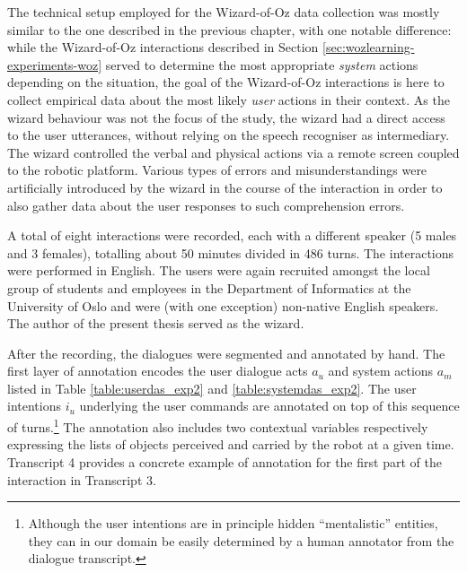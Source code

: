 The technical setup employed for the Wizard-of-Oz data collection was mostly similar to the one described in the previous chapter, with one notable difference:  while the Wizard-of-Oz interactions described in Section \ref{sec:wozlearning-experiments-woz} served to determine the most appropriate \textit{system} actions depending on the situation, the goal of the Wizard-of-Oz interactions is here to collect empirical data about the most likely \textit{user} actions in their context.  As the wizard behaviour was not the focus of the study, the wizard had a direct access to the user utterances, without relying on the speech recogniser as intermediary. The wizard controlled the verbal and physical actions via a remote screen coupled to the robotic platform. Various types of errors and misunderstandings were artificially introduced by the wizard in the course of the interaction in order to also gather data about the user responses to such comprehension errors. 

A total of eight interactions were recorded, each with a different speaker (5 males and 3 females), totalling about 50 minutes divided in 486 turns.  The interactions were performed in English. The users were again recruited amongst the local group of students and employees in the Department of Informatics at the University of Oslo and were (with one exception) non-native English speakers. The author of the present thesis served as the wizard. 

After the recording, the dialogues were segmented and annotated by hand. The first layer of annotation encodes the user dialogue acts $a_u$ and system actions $a_m$ listed in Table \ref{table:userdas_exp2} and \ref{table:systemdas_exp2}. The user intentions $i_u$ underlying the user commands are annotated on top of this sequence of turns.\footnote{Although the user intentions are in principle hidden ``mentalistic'' entities, they can in our domain be easily determined by a human annotator from the dialogue transcript.} The annotation also includes two contextual variables respectively expressing the lists of objects perceived and carried by the robot at a given time. Transcript 4 provides a concrete example of annotation for the first part of the interaction in Transcript 3. 

